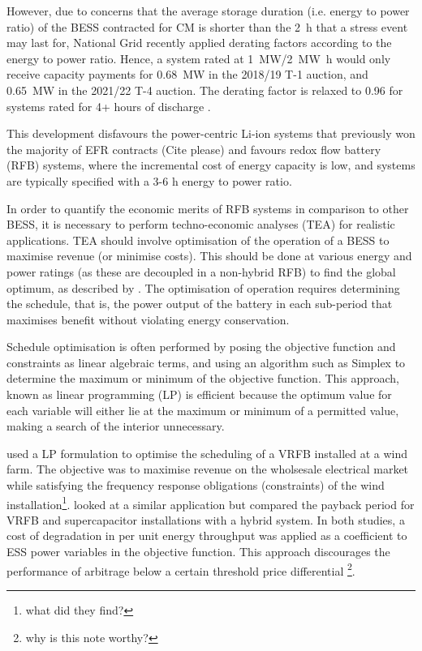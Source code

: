 \documentclass[preprint,3p,review,authoryear,10pt]{elsarticle}
\newcommand{\sol}[1]{\footnote{#1}\marginpar{\fbox{\thefootnote}}}
\begin{document}
However, due to concerns that the average storage duration (i.e. energy to power ratio) of the BESS contracted for CM is shorter than the \SI{2}{\hour} that a stress event may last for, National Grid recently applied derating factors according to the energy to power ratio. Hence, a system rated at \SI{1}{\mega\watt}/\SI{2}{\mega\watt\hour} would only receive capacity payments for \SI{0.68}{\mega\watt} in the 2018/19 T-1 auction, and \SI{0.65}{\mega\watt} in the 2021/22 T-4 auction. The derating factor is relaxed to 0.96 for systems rated for 4+ hours of discharge \cite{NGDeratingFactors}. 

This development disfavours the power-centric Li-ion systems that previously won the majority of EFR contracts (Cite please) and favours redox flow battery (RFB) systems, where the incremental cost of energy capacity is low, and systems are typically specified with a 3-6 \si{\hour} energy to power ratio. 

In order to quantify the economic merits of RFB systems in comparison to other BESS, it is necessary to perform techno-economic analyses (TEA) for realistic applications. TEA should involve optimisation of the operation of a BESS to maximise revenue (or minimise costs). This should be done at various energy and power ratings (as these are decoupled in a non-hybrid RFB) to find the global optimum, as described by \cite{Oudalov2007}. The optimisation of operation requires determining the schedule, that is, the power output of the battery in each sub-period that maximises benefit without violating energy conservation.

Schedule optimisation is often performed by posing the objective function and constraints as linear algebraic terms, and using an algorithm such as Simplex to determine the maximum or minimum of the objective function. This approach, known as linear programming (LP) is efficient because the optimum value for each variable will either lie at the maximum or minimum of a permitted value, making a search of the interior unnecessary.

\cite{Johnston2015} used a LP formulation to optimise the scheduling of a VRFB installed at a wind farm. The objective was to maximise revenue on the wholsesale electrical market while satisfying the frequency response obligations (constraints) of the wind installation\sol{what did they find?}. \cite{Vaca2017} looked at a similar application but compared the payback period for VRFB and supercapacitor installations with a hybrid system. In both studies, a cost of degradation in \pound per unit energy throughput was applied as a coefficient to ESS power variables in the objective function. This approach discourages the performance of arbitrage below a certain threshold price differential \sol{why is this note worthy?}.
\end{document}
